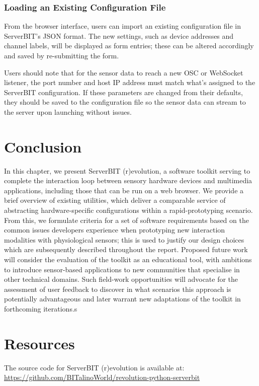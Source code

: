 \subsubsection{Loading an Existing Configuration File}

From the browser interface, users can import an existing configuration file in ServerBIT's JSON format. The new settings, such as device addresses and channel labels, will be displayed as form entries; these can be altered accordingly and saved by re-submitting the form.

Users should note that for the sensor data to reach a new OSC or WebSocket listener, the port number and host IP address must match what's assigned to the ServerBIT configuration. If these parameters are changed from their defaults, they should be saved to the configuration file so the sensor data can stream to the server upon launching without issues.

\section{Conclusion}

In this chapter, we present ServerBIT (r)evolution, a software toolkit serving to complete the interaction loop between sensory hardware devices and multimedia applications, including those that can be run on a web browser. We provide a brief overview of existing utilities, which deliver a comparable service of abstracting hardware-specific configurations within a rapid-prototyping scenario. From this, we formulate criteria for a set of software requirements based on the common issues developers experience when prototyping new interaction modalities with physiological sensors; this is used to justify our design choices which are subsequently described throughout the report.
Proposed future work will consider the evaluation of the toolkit as an educational tool, with ambitions to introduce sensor-based applications to new communities that specialise in other technical domains. Such field-work opportunities will advocate for the assessment of user feedback to discover in what scenarios this approach is potentially advantageous and later warrant new adaptations of the toolkit in forthcoming iterations.s

\section{Resources}
The source code for ServerBIT (r)evolution is available at:
\url{https://github.com/BITalinoWorld/revolution-python-serverbit}
